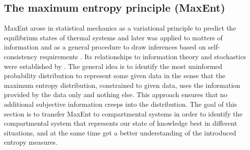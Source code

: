 \documentclass[smallextended]{svjour3}
\renewcommand{\P}{\mathbb{P}}
\begin{document}
\subsection{The maximum entropy principle (MaxEnt)}
% 

MaxEnt arose in statistical mechanics as a variational principle to predict the equilibrium states of thermal systems and later was applied to matters of information and as a general procedure to draw inferences based on self-consistency requirements \citep{Presse2013RMP}.
Its relationships to information theory and stochastics were established by \citet{Jaynes1957PR1, Jaynes1957PR2}.
The general idea is to identify the most uninformed probability distribution to represent some given data in the sense that the maximum entropy distribution, constrained to given data, uses the information provided by the data only and nothing else.
This approach ensures that no additional subjective information creeps into the distribution.
The goal of this section is to transfer MaxEnt to compartmental systems in order to identify the compartmental system that represents our state of knowledge best in different situations, and at the same time get a better understanding of the introduced entropy measures.
\end{document}
